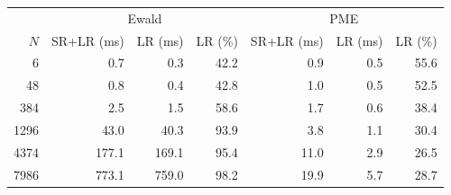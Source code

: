 \begin{tabular}{r | r r r | r r r}
\toprule
  \multicolumn{1}{c}{} & \multicolumn{3}{c}{Ewald} & \multicolumn{3}{c}{PME} \\ 
           $N$  &      SR+LR (ms)  &         LR (ms)  &         LR (\%)  &      SR+LR (ms)  &         LR (ms)  &         LR (\%) \\ 
\midrule
             6  &       \num{0.7}  &       \num{0.3}  &      \num{42.2}  &       \num{0.9}  &       \num{0.5}  &      \num{55.6} \\ 
            48  &       \num{0.8}  &       \num{0.4}  &      \num{42.8}  &       \num{1.0}  &       \num{0.5}  &      \num{52.5} \\ 
           384  &       \num{2.5}  &       \num{1.5}  &      \num{58.6}  &       \num{1.7}  &       \num{0.6}  &      \num{38.4} \\ 
          1296  &      \num{43.0}  &      \num{40.3}  &      \num{93.9}  &       \num{3.8}  &       \num{1.1}  &      \num{30.4} \\ 
          4374  &     \num{177.1}  &     \num{169.1}  &      \num{95.4}  &      \num{11.0}  &       \num{2.9}  &      \num{26.5} \\ 
          7986  &     \num{773.1}  &     \num{759.0}  &      \num{98.2}  &      \num{19.9}  &       \num{5.7}  &      \num{28.7} \\ 

\end{tabular}
